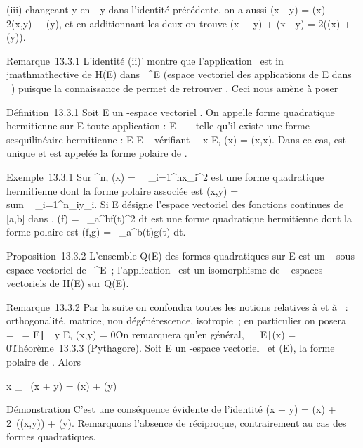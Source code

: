 \documentclass[]{article}
\begin{document}
(iii) changeant y en - y dans l'identité précédente, on a aussi \Phi(x - y)
= \Phi(x) - 2\phi(x,y) + \Phi(y), et en additionnant les deux on trouve \Phi(x + y)
+ \Phi(x - y) = 2(\Phi(x) + \Phi(y)).

Remarque~13.3.1 L'identité (ii)' montre que l'application
\phi\mapsto~\Phi est in\\jmathmathective de H(E) dans ~^E
(espace vectoriel des applications de E dans ~) puisque la connaissance
de \Phi permet de retrouver \phi. Ceci nous amène à poser

Définition~13.3.1 Soit E un -espace vectoriel . On appelle forme
quadratique hermitienne sur E toute application \Phi : E \rightarrow~ ~ telle qu'il
existe une forme sesquilinéaire hermitienne \phi : E \times E \rightarrow~  vérifiant
\forall~~x \in E, \Phi(x) = \phi(x,x). Dans ce cas, \phi est
unique et est appelée la forme polaire de \Phi.

Exemple~13.3.1 Sur ^n, \Phi(x) =\
\sum ~
_i=1^nx_i^2 est
une forme quadratique hermitienne dont la forme polaire associée est
\phi(x,y) = \\sum ~
_i=1^n\overlinex_iy_i.
Si E désigne l'espace vectoriel des fonctions continues de {[}a,b{]}
dans \mathbb{C}, \Phi(f) =\int ~
_a^bf(t)^2 dt est une forme
quadratique hermitienne dont la forme polaire est \phi(f,g)
=\int ~
_a^b\overlinef(t)g(t) dt.

Proposition~13.3.2 L'ensemble Q(E) des formes quadratiques sur E est un
~-sous-espace vectoriel de ~^E~; l'application
\phi\mapsto~\Phi est un isomorphisme de \mathbb{R}~-espaces
vectoriels de H(E) sur Q(E).

Remarque~13.3.2 Par la suite on confondra toutes les notions relatives à
\phi et à \Phi~: orthogonalité, matrice, non dégénérescence, isotropie~; en
particulier on posera
\mathrmKer~\Phi
= \mathrmKer~\phi =
\x \in
E∣\forall~~y \in E, \phi(x,y) =
0\. On remarquera qu'en général,
\mathrmKer\Phi\mathrel\neq~~\x
\in E∣\Phi(x) = 0\.

Théorème~13.3.3 (Pythagore). Soit E un -espace vectoriel ~et \Phi \inQ(E), \phi
la forme polaire de \Phi. Alors

x \bot_\phiy \rigtharrow~ \Phi(x + y) = \Phi(x) + \Phi(y)

Démonstration C'est une conséquence évidente de l'identité \Phi(x + y) =
\Phi(x) + 2\mathrmRe~(\phi(x,y)) +
\Phi(y). Remarquons l'absence de réciproque, contrairement au cas des
formes quadratiques.
\end{document}
